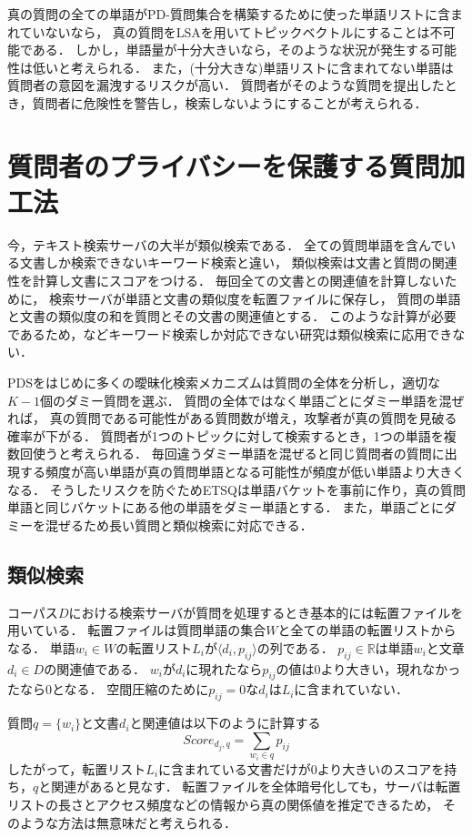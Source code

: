 \documentclass[master]{suribt}
\theoremstyle{definition}
\begin{document}
 真の質問の全ての単語がPD-質問集合を構築するために使った単語リストに含まれていないなら，
 真の質問をLSAを用いてトピックベクトルにすることは不可能である．
 しかし，単語量が十分大きいなら，そのような状況が発生する可能性は低いと考えられる．
 また，(十分大きな)単語リストに含まれてない単語は質問者の意図を漏洩するリスクが高い．
 質問者がそのような質問を提出したとき，質問者に危険性を警告し，検索しないようにすることが考えられる．

 \section{質問者のプライバシーを保護する質問加工法} \label{s:ETSQ}
 今，テキスト検索サーバの大半が類似検索である．
 全ての質問単語を含んでいる文書しか検索できないキーワード検索と違い，
 類似検索は文書と質問の関連性を計算し文書にスコアをつける\cite{if2006}．
 毎回全ての文書との関連値を計算しないために，
 検索サーバが単語と文書の類似度を転置ファイルに保存し，
 質問の単語と文書の類似度の和を質問とその文書の関連値とする．
 このような計算が必要であるため，\cite{pss2006,opf2005,pke2004,soe2000}などキーワード検索しか対応できない研究は類似検索に応用できない．

 PDSをはじめに多くの曖昧化検索メカニズム\cite{masking2014,praw2005,goo2009}は質問の全体を分析し，適切な$K−1$個のダミー質問を選ぶ．
 質問の全体ではなく単語ごとにダミー単語を混ぜれば，
 真の質問である可能性がある質問数が増え，攻撃者が真の質問を見破る確率が下がる．
 質問者が1つのトピックに対して検索するとき，1つの単語を複数回使うと考えられる．
 毎回違うダミー単語を混ぜると同じ質問者の質問に出現する頻度が高い単語が真の質問単語となる可能性が頻度が低い単語より大きくなる．
 そうしたリスクを防ぐためETSQは単語バケットを事前に作り，真の質問単語と同じバケットにある他の単語をダミー単語とする．
 また，単語ごとにダミーを混ぜるため長い質問と類似検索に対応できる．

 \subsection{類似検索}
 コーパス$D$における検索サーバが質問を処理するとき基本的には転置ファイルを用いている．
 転置ファイルは質問単語の集合$W$と全ての単語の転置リストからなる．
 単語$w_i \in W$の転置リスト$L_i$が$\langle d_i,p_{ij}\rangle$の列である．
 $p_{ij} \in \mathbb{R}$は単語$w_i$と文章$d_i \in D$の関連値である．
 $w_i$が$d_i$に現れたなら$p_{ij}$の値は$0$より大きい，現れなかったなら$0$となる．
 空間圧縮のために$p_{ij}=0$な$d_i$は$L_i$に含まれていない．

 質問$q=\{w_i\}$と文書$d_i$と関連値は以下のように計算する
 \begin{equation}
 Score_{d_j,q} = \sum_{w_i \in q}p_{ij}
 \end{equation}
 したがって，転置リスト$L_i$に含まれている文書だけが$0$より大きいのスコアを持ち，$q$と関連があると見なす．
 転置ファイルを全体暗号化しても，サーバは転置リストの長さとアクセス頻度などの情報から真の関係値を推定できるため，
 そのような方法は無意味だと考えられる．
 
\end{document}
